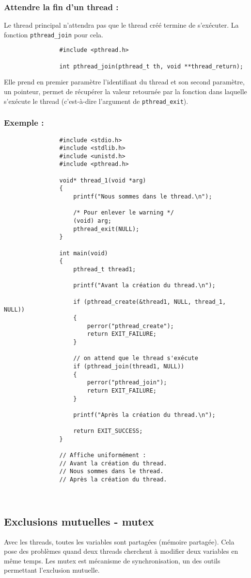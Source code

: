		\subsubsection*{Attendre la fin d'un thread :}
			Le thread principal n'attendra pas que le thread créé termine de s'exécuter. La fonction \lstinline!pthread_join! pour cela.
			\begin{lstlisting}
				#include <pthread.h>

				int pthread_join(pthread_t th, void **thread_return);
			\end{lstlisting}
			Elle prend en premier paramètre l'identifiant du thread et son second paramètre, un pointeur, permet de récupérer la valeur retournée par la fonction dans laquelle s'exécute le thread (c'est-à-dire l'argument de \lstinline!pthread_exit!).

		\subsubsection*{Exemple :}
			\begin{lstlisting}
				#include <stdio.h>
				#include <stdlib.h>
				#include <unistd.h>
				#include <pthread.h>

				void* thread_1(void *arg)
				{
					printf("Nous sommes dans le thread.\n");

					/* Pour enlever le warning */
					(void) arg;
					pthread_exit(NULL);
				}

				int main(void)
				{
					pthread_t thread1;

					printf("Avant la création du thread.\n");

					if (pthread_create(&thread1, NULL, thread_1, NULL)) 
					{
						perror("pthread_create");
						return EXIT_FAILURE;
					}
					
					// on attend que le thread s'exécute
					if (pthread_join(thread1, NULL)) 
					{
						perror("pthread_join");
						return EXIT_FAILURE;
					}

					printf("Après la création du thread.\n");

					return EXIT_SUCCESS;
				}
				
				// Affiche uniformément :
				// Avant la création du thread.
				// Nous sommes dans le thread.
				// Après la création du thread.
			\end{lstlisting}
			~\\
			
	\subsection{Exclusions mutuelles - mutex}
		Avec les threads, toutes les variables sont partagées (mémoire partagée). Cela pose des problèmes quand deux threads cherchent à modifier deux variables en même temps. Les mutex est mécanisme de synchronisation, un des outils permettant l'exclusion mutuelle.
		

